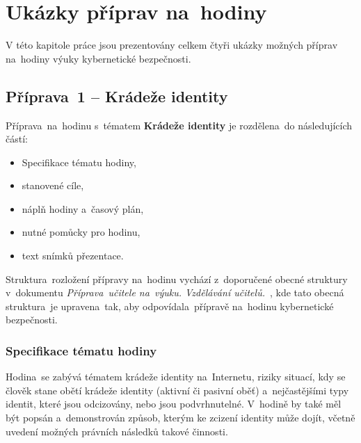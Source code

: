 \documentclass[a4paper, 12pt]{article}
\begin{document}


\newpage
\section{Ukázky příprav na~hodiny}
V této kapitole práce jsou prezentovány celkem čtyři ukázky možných příprav na~hodiny výuky kybernetické bezpečnosti.

\subsection{Příprava~1 -- Krádeže identity}
Příprava~na~hodinu s~tématem \textbf{Krádeže identity} je rozdělena~do následujících částí:
    \begin{itemize}
        \setlength{\itemsep}{-3pt}
        \item Specifikace tématu hodiny,
        \item stanovené cíle,
        \item náplň hodiny a~časový plán,
        \item nutné pomůcky pro hodinu,
        \item text snímků přezentace.
    \end{itemize}

Struktura~rozložení přípravy na~hodinu vychází z~doporučené obecné struktury v~dokumentu \textit{Příprava~učitele na~výuku. Vzdělávání učitelů.}~\cite{presentationPavlaZ}, kde tato obecná struktura~je upravena~tak, aby odpovídala~přípravě na~hodinu kybernetické bezpečnosti.

\subsubsection{Specifikace tématu hodiny}
Hodina~se zabývá tématem krádeže identity na~Internetu, riziky situací, kdy se člověk stane obětí krádeže identity (aktivní či pasivní oběť) a~nejčastějšími typy identit, které jsou odcizovány, nebo jsou podvrhnutelné. V~hodině by také měl být popsán a~demonstrován způsob, kterým ke zcizení identity může dojít, včetně uvedení možných právních následků takové činnosti.
\end{document}
